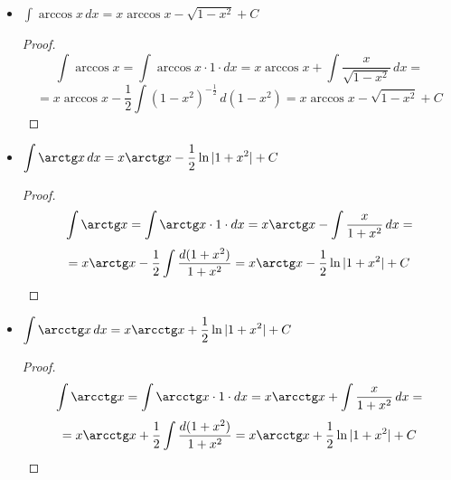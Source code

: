 \begin{itemize}
	\item $\displaystyle \int \arccos x\,dx = x \arccos x - \sqrt{1 - x^2} + C$
	\begin{proof}
	\begin{equation*}
	\int \arccos x =
	\int \arccos x \cdot 1 \cdot dx =
	x \arccos x + \int \frac{x}{\sqrt{1 - x^2}}\,dx =
	\end{equation*}
	\begin{equation*}
	= x \arccos x - \frac12 \int (1 - x^2)^{-\tfrac12}\,d(1 - x^2) =
	x \arccos x - \sqrt{1 - x^2} + C
	\end{equation*}
	\end{proof}
	
	\item $\displaystyle \int \arctg x\,dx = x \arctg x - \frac12 \ln |1 + x^2| + C$
	\begin{proof}
	\begin{equation*}
	\int \arctg x =
	\int \arctg x \cdot 1 \cdot dx =
	x \arctg x - \int \frac{x}{1 + x^2}\,dx =
	\end{equation*}
	\begin{equation*}
	= x \arctg x - \frac12 \int \frac{d(1 + x^2)}{1 + x^2} =
	x \arctg x - \frac12 \ln |1 + x^2| + C
	\end{equation*}
	\end{proof}
	
	\item $\displaystyle \int \arcctg x\,dx = x \arcctg x + \frac12 \ln |1 + x^2| + C$
	\begin{proof}
	\begin{equation*}
	\int \arcctg x =
	\int \arcctg x \cdot 1 \cdot dx =
	x \arcctg x + \int \frac{x}{1 + x^2}\,dx =
	\end{equation*}
	\begin{equation*}
	= x \arcctg x + \frac12 \int \frac{d(1 + x^2)}{1 + x^2} =
	x \arcctg x + \frac12 \ln |1 + x^2| + C
	\end{equation*}
	\end{proof}
\end{itemize}

